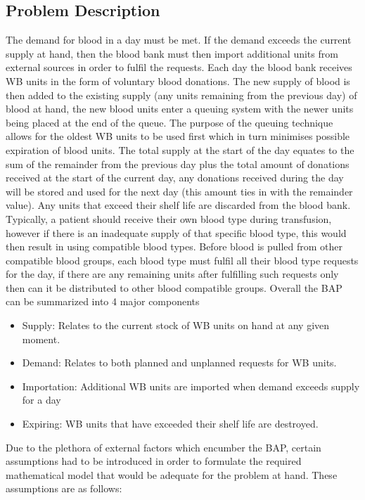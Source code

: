 \documentclass{article}
\begin{document}
\subsection{Problem Description}
The demand for blood in a day must be met. If the demand exceeds the current supply at hand, then the blood bank must then import additional units from external sources in order to fulfil the requests. Each day the blood bank receives WB units in the form of voluntary blood donations. The new supply of blood is then added to the existing supply (any units remaining from the previous day) of blood at hand, the new blood units enter a queuing system with the newer units being placed at the end of the queue. The purpose of the queuing technique allows for the oldest WB units to be used first which in turn minimises possible expiration of blood units. The total supply at the start of the day equates to the sum of the remainder from the previous day plus the total amount of donations received at the start of the current day, any donations received during the day will be stored and used for the next day (this amount ties in with the remainder value). Any units that exceed their shelf life are discarded from the blood bank. Typically, a patient should receive their own blood type during transfusion, however if there is an inadequate supply of that specific blood type, this would then result in using compatible blood types. Before blood is pulled from other compatible blood groups, each blood type must fulfil all their blood type requests for the day, if there are any remaining units after fulfilling such requests only then can it be distributed to other blood compatible groups. Overall the BAP can be summarized into 4 major components
\begin{itemize}
\item Supply: Relates to the current stock of WB units on hand at any given moment.
\item Demand: Relates to both planned and unplanned requests for WB units.
\item Importation: Additional WB units are imported when demand exceeds supply for a day
\item Expiring: WB units that have exceeded their shelf life are destroyed.

\end{itemize}
Due to the plethora of external factors which encumber the BAP, certain assumptions had to be introduced in order to formulate the required mathematical model that would be adequate for the problem at hand. These assumptions are as follows:
\end{document}
